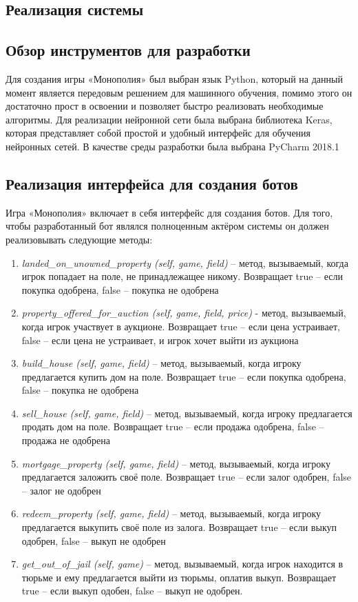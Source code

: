 \setlength{\parskip}{0cm}
\begin{Large}
\newpage
\section{Реализация системы}
\subsection{Обзор инструментов для разработки}
Для создания игры «Монополия» был выбран язык Python, который на данный момент является передовым решением для машинного обучения, помимо этого он достаточно прост в освоении и позволяет быстро реализовать необходимые алгоритмы. Для реализации нейронной сети была выбрана библиотека Keras, которая представляет собой простой и удобный интерфейс для обучения нейронных сетей. В качестве среды разработки была выбрана PyCharm 2018.1
\subsection{Реализация интерфейса для создания ботов}
Игра «Монополия» включает в себя интерфейс для создания ботов. Для того, чтобы разработанный бот являлся полноценным актёром системы он должен реализовывать следующие методы:
\begin{enumerate}
    \item \textit{landed\_on\_unowned\_property (self, game, field)} – метод, вызываемый, когда игрок попадает на поле, не принадлежащее никому. Возвращает true – если покупка одобрена, false – покупка не одобрена
    \item \textit{property\_offered\_for\_auction (self, game, field, price)} - метод, вызываемый, когда игрок участвует в аукционе. Возвращает true – если цена устраивает, false – если цена не устраивает, и игрок хочет выйти из аукциона
    \item \textit{build\_house (self, game, field)} – метод, вызываемый, когда игроку предлагается купить дом на поле. Возвращает true – если покупка одобрена, false – покупка не одобрена
    \item \textit{sell\_house (self, game, field)} – метод, вызываемый, когда игроку предлагается продать дом на поле. Возвращает true – если продажа одобрена, false – продажа не одобрена
    \item \textit{mortgage\_property (self, game, field)} – метод, вызываемый, когда игроку предлагается заложить своё поле. Возвращает true – если залог одобрен, false – залог не одобрен
    \item \textit{redeem\_property (self, game, field)} – метод, вызываемый, когда игроку предлагается выкупить своё поле из залога. Возвращает true – если выкуп одобрен, false – выкуп не одобрен
    \item \textit{get\_out\_of\_jail (self, game)} – метод, вызываемый, когда игрок находится в тюрьме и ему предлагается выйти из тюрьмы, оплатив выкуп. Возвращает true – если выкуп одобен, false – выкуп не одобрен.
\end{enumerate}

\end{Large}
